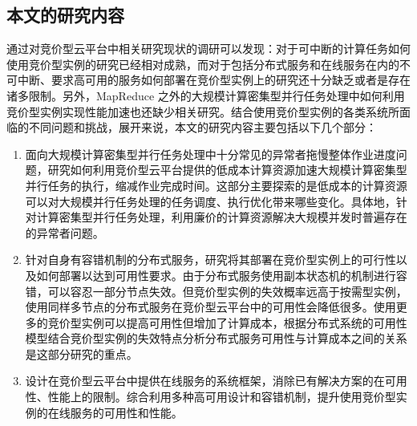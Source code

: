 \subsection{本文的研究内容}
通过对竞价型云平台中相关研究现状的调研可以发现：对于可中断的计算任务如何使用竞价型实例的研究已经相对成熟，而对于包括分布式服务和在线服务在内的不可中断、要求高可用的服务如何部署在竞价型实例上的研究还十分缺乏或者是存在诸多限制。另外，MapReduce 之外的大规模计算密集型并行任务处理中如何利用竞价型实例实现性能加速也还缺少相关研究。结合使用竞价型实例的各类系统所面临的不同问题和挑战，展开来说，本文的研究内容主要包括以下几个部分：
\begin{enumerate}
\item 面向大规模计算密集型并行任务处理中十分常见的异常者拖慢整体作业进度问题，研究如何利用竞价型云平台提供的低成本计算资源加速大规模计算密集型并行任务的执行，缩减作业完成时间。这部分主要探索的是低成本的计算资源可以对大规模并行任务处理的任务调度、执行优化带来哪些变化。具体地，针对计算密集型并行任务处理，利用廉价的计算资源解决大规模并发时普遍存在的异常者问题。
\item 针对自身有容错机制的分布式服务，研究将其部署在竞价型实例上的可行性以及如何部署以达到可用性要求。由于分布式服务使用副本状态机的机制进行容错，可以容忍一部分节点失效。但竞价型实例的失效概率远高于按需型实例，使用同样多节点的分布式服务在竞价型云平台中的可用性会降低很多。使用更多的竞价型实例可以提高可用性但增加了计算成本，根据分布式系统的可用性模型结合竞价型实例的失效特点分析分布式服务可用性与计算成本之间的关系是这部分研究的重点。
\item 设计在竞价型云平台中提供在线服务的系统框架，消除已有解决方案的在可用性、性能上的限制。综合利用多种高可用设计和容错机制，提升使用竞价型实例的在线服务的可用性和性能。
\end{enumerate}

